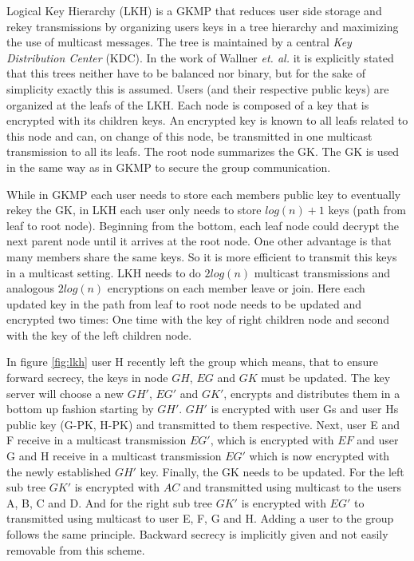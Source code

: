 Logical Key Hierarchy (\ac{LKH})\cite{wallner1999key} is a \ac{GKMP} that reduces user side storage and rekey transmissions by organizing users keys in a tree hierarchy and maximizing the use of multicast messages. The tree is maintained by a central \textit{Key Distribution Center} (\ac{KDC}). In the work of Wallner \textit{et. al.} \cite{wallner1999key} it is explicitly stated that this trees neither have to be balanced nor binary, but for the sake of simplicity exactly this is assumed. Users (and their respective public keys) are organized at the leafs of the LKH. Each node is composed of a key that is encrypted with its children keys. An encrypted key is known to all leafs related to this node and can, on change of this node, be transmitted in one multicast transmission to all its leafs. The root node summarizes the \ac{GK}. The \ac{GK} is used in the same way as in \ac{GKMP} to secure the group communication. 

While in \ac{GKMP} each user needs to store each members public key to eventually rekey the GK, in \ac{LKH} each user only needs to store $log(n) +1$ keys (path from leaf to root node). Beginning from the bottom, each leaf node could decrypt the next parent node until it arrives at the root node. One other advantage is that many members share the same keys. So it is more efficient to transmit this keys in a multicast setting. \ac{LKH} needs to do $2 log(n)$ multicast transmissions and analogous $2 log(n)$ encryptions on each member leave or join.  Here each updated key in the path from leaf to root node needs to be updated and encrypted two times: One time with the key of right children node and second with the key of the left children node. 

In figure \ref{fig:lkh} user H recently left the group which means, that to ensure forward secrecy, the keys in node $GH$, $EG$ and $GK$ must be updated. The key server will choose a new $GH'$, $EG'$ and $GK'$, encrypts and distributes them in a bottom up fashion starting by $GH'$. $GH'$ is encrypted with user Gs and user Hs public key (G-PK, H-PK) and transmitted to them respective. Next, user E and F receive in a multicast transmission $EG'$, which is encrypted with $EF$ and user G and H receive in a multicast transmission $EG'$ which is now encrypted with the newly established $GH'$ key. Finally, the GK needs to be updated. For the left sub tree $GK'$ is encrypted with $AC$ and transmitted using multicast to the users A, B, C and D. And for the right sub tree $GK'$ is encrypted with $EG'$ to transmitted using multicast to user E, F, G and H. Adding a user to the group follows the same principle. Backward secrecy is implicitly given and not easily removable from this scheme.

